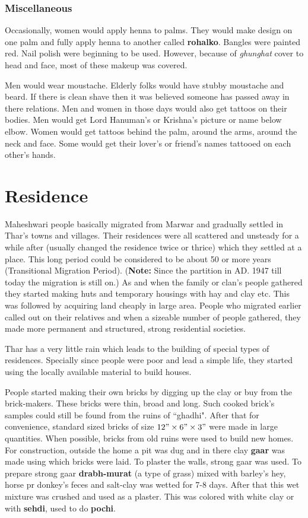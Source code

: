 \subsubsection*{Miscellaneous}
Occasionally, women would apply henna to palms. They would make design on one
palm and fully apply henna to another called \textbf{rohalko}. Bangles were
painted red. Nail polish were beginning to be used. However, because of
\textit{ghunghat} cover to head and face, most of these makeup was covered.

Men would wear moustache. Elderly folks would have stubby moustache and beard.
If there is clean shave then it was believed someone has passed away in there
relations. Men and women in those days would also get tattoos on their bodies.
Men would get Lord Hanuman's or Krishna's picture or name below elbow. Women
would get tattoos behind the palm, around the arms, around the neck and face.
Some would get their lover's or friend's names tattooed on each other's hands.

\section{Residence}
Maheshwari people basically migrated from Marwar and gradually settled in Thar's
towns and villages. Their residences were all scattered and unsteady for a while
after (usually changed the residence twice or thrice) which they settled at a
place. This long period could be considered to be about 50 or more years
(Transitional Migration Period). (\textbf{Note:} Since the partition in AD. 1947
till today the migration is still on.) As and when the family or clan's people
gathered they started making huts and temporary housings with hay and clay etc.
This was followed by acquiring land cheaply in large area. People who migrated
earlier called out on their relatives and when a sizeable number of people
gathered, they made more permanent and structured, strong residential societies.

Thar has a very little rain which leads to the building of special types of
residences. Specially since people were poor and lead a simple life, they
started using the locally available material to build houses.

People started making their own bricks by digging up the clay or buy from the
brick-makers. These bricks were thin, broad and long. Such cooked brick's
samples could still be found from the ruins of ``ghadhi". After that for
convenience, standard sized bricks of size $12" \times 6" \times 3"$ were made
in large quantities. When possible, bricks from old ruins were used to build new
homes. For construction, outside the home a pit was dug and in there clay
\textbf{gaar} was made using which bricks were laid. To plaster the walls,
strong gaar was used. To prepare strong gaar \textbf{drabh-murat} (a type of
grass) mixed with barley's hey, horse pr donkey's feces and salt-clay was wetted
for 7-8 days. After that this wet mixture was crushed and used as a plaster.
This was colored with white clay or with \textbf{sehdi}, used to do
\textbf{pochi}.

